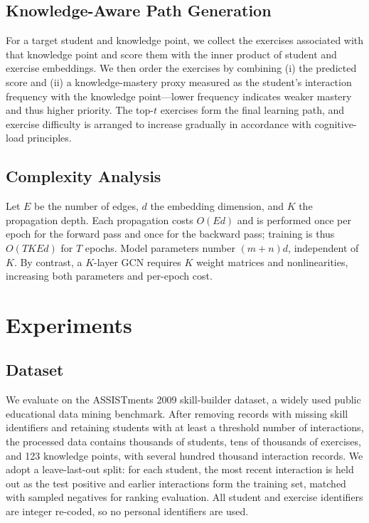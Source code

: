 \documentclass[sn-mathphys]{sn-jnl}
\begin{document}
\subsection{Knowledge-Aware Path Generation}
For a target student and knowledge point, we collect the exercises associated with that knowledge point and score them with the inner product of student and exercise embeddings. We then order the exercises by combining (i) the predicted score and (ii) a knowledge-mastery proxy measured as the student's interaction frequency with the knowledge point---lower frequency indicates weaker mastery and thus higher priority. The top-$t$ exercises form the final learning path, and exercise difficulty is arranged to increase gradually in accordance with cognitive-load principles.

\subsection{Complexity Analysis}
Let $E$ be the number of edges, $d$ the embedding dimension, and $K$ the propagation depth. Each propagation costs $O(Ed)$ and is performed once per epoch for the forward pass and once for the backward pass; training is thus $O(TKEd)$ for $T$ epochs. Model parameters number $(m+n)d$, independent of $K$. By contrast, a $K$-layer GCN requires $K$ weight matrices and nonlinearities, increasing both parameters and per-epoch cost.

\section{Experiments}
\label{sec:exp}

\subsection{Dataset}
We evaluate on the ASSISTments 2009 skill-builder dataset, a widely used public educational data mining benchmark. After removing records with missing skill identifiers and retaining students with at least a threshold number of interactions, the processed data contains thousands of students, tens of thousands of exercises, and 123 knowledge points, with several hundred thousand interaction records. We adopt a leave-last-out split: for each student, the most recent interaction is held out as the test positive and earlier interactions form the training set, matched with sampled negatives for ranking evaluation. All student and exercise identifiers are integer re-coded, so no personal identifiers are used.
\end{document}
